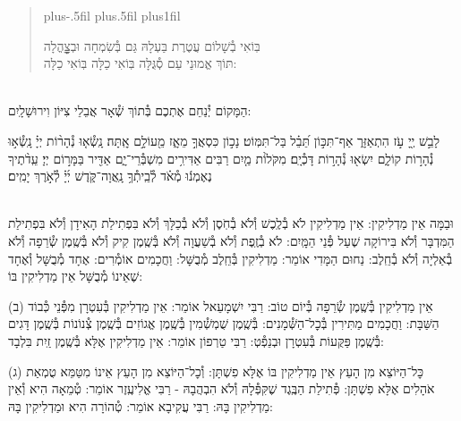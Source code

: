 \documentclass[twoside, openany, parskip=half, 11pt]{book}
\begin{document}
\begin{quote}
\leftskip=0pt plus-.5fil
\rightskip=0pt plus.5fil
\parfillskip=0pt plus1fil

בּֽוֹאִי בְ֯שָׁלוֹם עֲטֶרֶת בַּעְלָהּ \hfill
גַּם בְּ֯שִׂמְחָה וּבְצׇׇׇׇׇׇׇׇׇהֳלָה \\
תּוֹךְ אֱמוּנֵי עַם סְ֯גֻּלָּה \hfill
בּֽוֹאִי כַלָּה בּֽוֹאִי כַלָּה:

\lechadodi

\end{quote}

\begin{sometimes}

\\
הַמָּקוֹם יְ֯נַחֵם אֶתְכֶם בְּ֯תוֹךְ שְׁ֯אָר אֲבֵלֵי צִיּוֹן וִירוּשָׁלָֽיִם:

\end{sometimes}


\mizmorshabbat

לָבֵ֣שׁ יְ֖יָ עֹ֣ז הִתְאַזָּר֑ אַף־תִּכּ֣וֹן תֵּ֝בֵ֗ל בַּל־תִּמּֽוֹט׃
נָכ֣וֹן כִּסְאֲךָ֣ מֵאָ֑ז מֵ֖עוֹלָ֣ם אׇֽתָּה׃
נָֽשְׂ֯א֤וּ נְ֯הָר֨וֹת יְיָ֗ נָֽשְׂ֯א֣וּ נְ֯הָר֣וֹת קוֹלָ֑ם יִשְׂא֖וּ נְ֯הָר֣וֹת דָּכְ֯יָֽם׃
מִקֹּלוֹ֨ת מַ֤יִם רַבִּים אַדִּירִ֥ים מִשְׁבְּ֯רֵי־יָ֑ם אַדִּ֖יר בַּמָּר֣וֹם יְיָ׃
עֵֽדֹ֨תֶיךָ נֶאֶמְנ֬וּ מְ֯אֹ֗ד לְ֯בֵֽיתְ֯ךָ֥ נָֽאֲוָה־קֹּ֑דֶשׁ יְ֜יָ֗ לְ֯אֹ֣רֶךְ יָמִֽים׃

\mournerskaddish


\\
וּבַמָּה אֵין מַדְלִיקִין: אֵין מַדְלִיקִין לֹא בְ֯לֶֽכֶשׁ וְ֯לֹא בְ֯חֹֽסֶן וְ֯לֹא בְ֯כַלָּךְ וְ֯לֹא בִּפְתִילַת הָאִידָן וְ֯לֹא בִּפְתִילַת הַמִּדְבָּר וְ֯לֹא בִּירוֹקָה שֶׁעַל פְּ֯נֵי הַמָּֽיִם: לֹא בְ֯זֶֽפֶת וְ֯לֹא בְ֯שַׁעֲוָה וְ֯לֹא בְּ֯שֶֽׁמֶן קִיק וְ֯לֹא בְּ֯שֶֽׁמֶן שְׂ֯רֵפָה וְ֯לֹא בְ֯אַלְיָה וְ֯לֹא בְ֯חֵֽלֶב: נַחוּם הַמָּדִי אוֹמֵר: מַדְלִיקִין בְּ֯חֵֽלֶב מְ֯בֻשָּׁל: וַחֲכָמִים אוֹמְ֯רִים: אֶחָד מְ֯בֻשָּׁל וְ֯אֶחָד שֶׁאֵינוֹ מְ֯בֻשָּׁל אֵין מַדְלִיקִין בּוֹ:

(ב) אֵין מַדְלִיקִין בְּ֯שֶֽׁמֶן שְׂ֯רֵפָה בְּ֯יוֹם טוֹב: רַבִּי יִשְׁמָעֵאל אוֹמֵר: אֵין מַדְלִיקִין בְּ֯עִטְרָן מִפְּ֯נֵי כְּ֯בוֹד הַשַּׁבָּת: וַחֲכָמִים מַתִּירִין בְּ֯כׇל־הַשְּׁ֯מָנִים: בְּ֯שֶֽׁמֶן שֻׁמְשְׁ֯מִין בְּ֯שֶֽׁמֶן אֱגוֹזִים בְּ֯שֶֽׁמֶן צְ֯נוֹנוֹת בְּ֯שֶֽׁמֶן דָּגִים בְּ֯שֶֽׁמֶן פַּקֻּעוֹת בְּ֯עִטְרָן וּבְנֵפְ֯טְ: רַבִּי טַרְפוֹן אוֹמֵר: אֵין מַדְלִיקִין אֶלָּא בְּ֯שֶֽׁמֶן זַֽיִת בִּלְבָד:

(ג) כׇּל־הַיּוֹצֵא מִן הָעֵץ אֵין מַדְלִיקִין בּוֹ אֶלָּא פִשְׁתָּן: וְ֯כׇל־הַיּוֹצֵא מִן הָעֵץ אֵינוֹ מִטַּמֵּא טֻמְאַת אֹהָלִים אֶלָּא פִשְׁתָּן: פְּ֯תִילַת הַבֶּֽגֶד שֶׁקִּפְּ֯לָהּ וְ֯לֹא הִבְהֲבָהּ - רַבִּי אֱלִיעֶֽזֶר אוֹמֵר: טְ֯מֵאָה הִיא וְ֯אֵין מַדְלִיקִין בָּהּ: רַבִּי עֲקִיבָא אוֹמֵר: טְ֯הוֹרָה הִיא וּמַדְלִיקִין בָּהּ:
\end{document}
